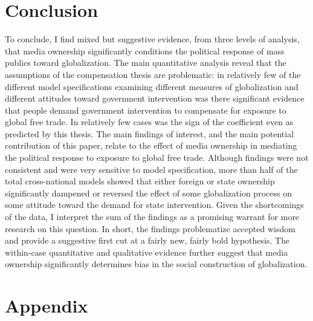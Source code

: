 \documentclass[12pt]{report}
\begin{document}
\section{Conclusion}

To conclude, I find mixed but suggestive evidence, from three levels of analysis, that media
ownership significantly conditions the political response of mass publics toward globalization. The
main quantitative analysis reveal that the assumptions of the compensation thesis are problematic:
in relatively few of the different model specifications examining different measures of
globalization and different attitudes toward government intervention was there significant evidence
that people demand government intervention to compensate for exposure to global free trade. In
relatively few cases was the sign of the coefficient even as predicted by this thesis. The main
findings of interest, and the main potential contribution of this paper, relate to the effect of
media ownership in mediating the political response to exposure to global free trade. Although
findings were not consistent and were very sensitive to model specification, more than half of the
total cross-national models showed that either foreign or state ownership significantly dampened or
reversed the effect of some globalization process on some attitude toward the demand for state
intervention. Given the shortcomings of the data, I interpret the sum of the findings as a promising
warrant for more research on this question. In short, the findings problematize accepted wisdom and
provide a suggestive first cut at a fairly new, fairly bold hypothesis. The within-case quantitative
and qualitative evidence further suggest that media ownership significantly determines bias in the
social construction of globalization.

\section{Appendix}
\end{document}
